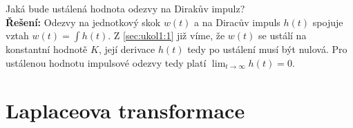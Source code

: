 \documentclass[twoside]{article}
\begin{document}
\subsection{~}
\label{sec:ukol1:3}
Jaká bude ustálená hodnota odezvy na Dirakův impulz? \\
\textbf{Řešení:} Odezvy na jednotkový skok $w(t)$ a na Diracův impuls $h(t)$ spojuje vztah $w(t) = \int h(t)$. Z \ref{sec:ukol1:1} již víme, že $w(t)$ se ustálí
na konstantní hodnotě $K$, její derivace $h(t)$ tedy po ustálení musí být nulová. Pro ustálenou hodnotu impulsové odezvy tedy platí $\lim_{t \to \infty} h(t) = 0$.

\section{Laplaceova transformace}
\label{sec:ukol2}
\end{document}
